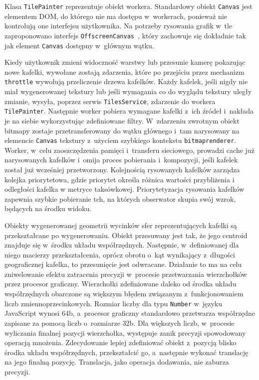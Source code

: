 Klasa \texttt{TilePainter} reprezentuje obiekt workera. Standardowy obiekt \texttt{Canvas} jest elementem DOM, do którego nie ma dostępu w~workerach, ponieważ nie kontrolują one interfejsu użytkownika. Na potrzeby rysowania grafik w~tle zaproponowano interfejs \texttt{OffscreenCanvas}~\cite{OffscreenCanvas}, który zachowuje się dokładnie tak jak element \texttt{Canvas} dostępny w~głównym wątku.

Kiedy użytkownik zmieni widoczność warstwy lub przesunie kamerę pokazując nowe kafelki, wywołane zostają zdarzenia, które po przejściu przez mechanizm \texttt{throttle} wywołują przeliczenie drzewa kafelków. Każdy kafelek, jeśli nigdy nie miał wygenerowanej tekstury lub jeśli wymagania co do wyglądu tekstury uległy zmianie, wysyła, poprzez serwis \texttt{TilesService}, zdarzenie do workera \texttt{TilePainter}. Następnie worker pobiera wymagane kafelki z~ich źródeł i~nakłada je na siebie wykorzystując zdefiniowane filtry. W~zdarzeniu zwrotnym obiekt bitmapy zostaje przetransferowany do wątku głównego i~tam narysowany na elemencie \texttt{Canvas} tekstury z~użyciem szybkiego kontekstu \texttt{bitmaprenderer}. Worker, w~celu zaoszczędzenia pamięci i~transferu sieciowego, prowadzi cache już narysowanych kafelków i~omija proces pobierania i~kompozycji, jeśli kafelek został już wcześniej przetworzony. Kolejnością rysowanych kafelków zarządza kolejka priorytetowa, gdzie priorytet określa różnica wartości przybliżenia i odległości kafelka w metryce taksówkowej. Priorytetyzacja rysowania kafelków zapewnia szybkie pobieranie tch, na których obserwator skupia swój wzrok, będących na środku widoku.

Obiekty wygenerowanej geometrii wycinków sfer reprezentujących kafelki są przekształcane po wygenerowaniu. Obiekt przesuwany jest tak, że jego centroid znajduje się w~środku układu współrzędnych. Następnie, w~definiowanej dla niego macierzy przekształcenia, oprócz obrotu o~kąt wynikający z~długości geograficznej kafelka, to przesunięcie jest odwracane. Działanie to ma na celu zniwelowanie efektu zatracenia precyzji w~procesie przetwarzania wierzchołków przez procesor graficzny. Wierzchołki zdefiniowane daleko od środka układu współrzędnych obarczone są większym błędem związanym z~funkcjonowaniem liczb zmiennoprzecinkowych. Rozmiar liczby dla typu \texttt{Number} w~języku JavaScript wynosi 64b, a~procesor graficzny standardowo przetwarza współrzędne zapisane za pomocą liczb o~rozmiarze 32b. Dla większych liczb, w~procesie wyliczania finalnej pozycji wierzchołka, występuje zanik precyzji spowodowany operacją mnożenia. Zdecydowanie lepiej zdefiniować obiekt z~pozycją blisko środka układu współrzędnych, przekształcić go, a~następnie wykonać translację na jego finalną pozycję. Translacja, jako operacja dodawania, nie zaburza precyzji.

